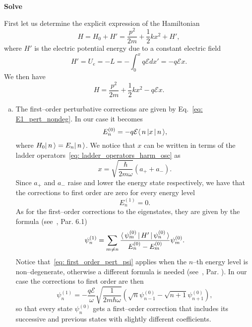 \textbf{Solve}

First let us determine the explicit expression of the Hamiltonian
\begin{equation}
    H = H_0 + H' = \frac{p^2}{2 m} + \frac{1}{2} k x^2 + H',
\end{equation}
where $H'$ is the electric potential energy due to a constant electric field
\begin{equation}
    \label{eq: H_pert_const_E}
    H' = U_e = - L = - \int_0^x q \mathcal{E} dx' = -q \mathcal{E} x.
\end{equation}
We then have 
\begin{equation}
    \label{eq: harm_osc_linear_pert}
    H = \frac{p^2}{2 m} + \frac{1}{2} k x^2 - q \mathcal{E} x.
\end{equation}
\begin{enumerate}[(a)]
    \item The first--order perturbative corrections are given by Eq.~\eqref{eq: E1_pert_nondeg}. In our case it becomes 
    \begin{equation}
        E_n^{(0)} = -q \mathcal{E} \langle \, n \, | x \, | \, n \, \rangle,
    \end{equation}
    where $H_0 | \, n \, \rangle = E_n | \, n \, \rangle$. We notice that $x$ can be written in terms of the ladder operators~\eqref{eq: ladder_operators_harm_osc} as 
    \begin{equation}
        \label{eq: x_ladder_harm_osc}
        x = \sqrt{\frac{\hbar}{2 m \omega}} (a_+ + a_-).
    \end{equation}
    Since $a_+$ and $a_-$ raise and lower the energy state respectively, we have that the corrections to first order are zero for every energy level
    \begin{equation}
        E_n^{(1)} = 0.
    \end{equation}
    As for the first--order corrections to the eigenstates, they are given by the formula (see~\cite{griffiths2018introduction}, Par. 6.1)
    \begin{equation}
        \label{eq: first_order_pert_psi}
        \psi_n^{(1)} = \sum_{m \ne n} \frac{\langle \, \psi_m^{(0)} \, | \, H' \, | \, \psi_n^{(0)} \, \rangle}{E_n^{(0)} - E_m^{(0)}} \psi_m^{(0)}.
    \end{equation}
    Notice that~\eqref{eq: first_order_pert_psi} applies when the $n$--th energy level is non--degenerate, otherwise a different formula is needed (see~\cite{bransden1989introduction}, Par. ). In our case the corrections to first order are then
    \begin{equation}
        \psi_n^{(1)} = - \frac{q \mathcal{E}}{\omega} \sqrt{\frac{1}{2 m \hbar \omega}} ( \sqrt{n}\psi_{n-1}^{(0)} - \sqrt{n+1} \psi_{n+1}^{(0)} ),
    \end{equation}
    so that every state $\psi_n^{(0)}$ gets a first--order correction that includes its successive and previous states with slightly different coefficients. 


\end{enumerate}
